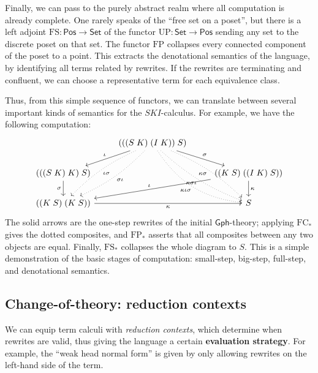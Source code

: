 \documentclass{amsart}
\theoremstyle{definition}
\newcommand{\Gph}{\mathsf{Gph}}
\newcommand{\Set}{\mathsf{Set}}
\newcommand{\Pos}{\mathsf{Pos}}
\newcommand{\FC}{\mathrm{FC}}
\newcommand{\FP}{\mathrm{FP}}
\newcommand{\FS}{\mathrm{FS}}
\newcommand{\UP}{\mathrm{UP}}
\newcommand{\maps}{\colon}
\begin{document}
Finally, we can pass to the purely abstract realm where all computation is already complete.   One rarely speaks of the ``free set on a poset'', but there is a left adjoint $\FS\maps \Pos \to \Set$ of the functor $\UP \maps \Set \to \Pos$ sending any set to the discrete poset on that set.
The functor $\FP$ collapses every connected component of the poset to a point.   This extracts
the denotational semantics of the language, by identifying all terms related by rewrites.  If the rewrites are terminating and confluent, we can choose a representative term for each equivalence class.

Thus, from this simple sequence of functors, we can translate between several important kinds of semantics for the $SKI$-calculus. For example, we have the following computation:
\[\begin{tikzcd}
&	(((S\; K)\; (I\; K))\; S) \arrow[rd,"\sigma"] \arrow[ld,swap,"\iota"] \arrow[ddl,dotted,bend left=10,"\sigma\iota"] \arrow[ddl,dotted,bend right=10,"\iota\sigma"] \arrow[ddr,dotted,swap,bend left=10,"\kappa\sigma"] \arrow[ddr,dotted,bend right=10,swap,"\kappa\sigma\iota"] \arrow[ddr,dotted,swap,bend right=25,"\kappa\iota\sigma"] &\\
(((S\; K)\; K)\; S) \arrow[d,swap,"\sigma"] & & ((K\; S)\; ((I\; K)\; S)) \arrow[lld,swap,"\iota"] \arrow[d,"\kappa"]\\
((K\; S)\; (K\; S)) \arrow[rr,swap,"\kappa"] & & S
\end{tikzcd}\]
The solid arrows are the one-step rewrites of the initial $\Gph$-theory; applying $\FC_*$ gives the dotted composites, and $\FP_*$ asserts that all composites between any two objects are equal. Finally, $\FS_*$ collapses the whole diagram to $S$. This is a simple demonstration of the basic stages of computation: small-step, big-step, full-step, and denotational semantics.

\subsection{Change-of-theory: reduction contexts}
We can equip term calculi with \textit{reduction contexts}, which determine when rewrites are valid, thus giving the language a certain \textbf{evaluation strategy}. For example, the ``weak head normal form'' is given by only allowing rewrites on the left-hand side of the term.
\end{document}
